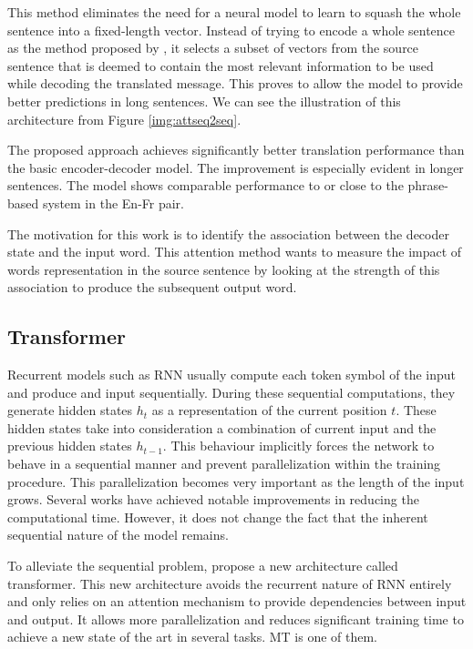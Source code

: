 This method eliminates the need for a neural model to learn to squash the whole sentence into a fixed-length vector. Instead of trying to encode a whole sentence as the method proposed by \cite{sutskever2014sequence}, it selects a subset of vectors from the source sentence that is deemed to contain the most relevant information to be used while decoding the translated message. This proves to allow the model to provide better predictions in long sentences. We can see the illustration of this architecture from Figure \ref{img:attseq2seq}.

The proposed approach achieves significantly better translation performance than the basic encoder-decoder model. The improvement is especially evident in longer sentences. The model shows comparable performance to or close to the phrase-based system in the En-Fr pair.

The motivation for this work is to identify the association between the decoder state and the input word. This attention method wants to measure the impact of words representation in the source sentence by looking at the strength of this association to produce the subsequent output word.

\subsection{Transformer}
Recurrent models such as RNN usually compute each token symbol of the input and produce and input sequentially. During these sequential computations, they generate hidden states $h_t$ as a representation of the current position $t$. These hidden states take into consideration a combination of current input and the previous hidden states $h_{t-1}$. This behaviour implicitly forces the network to behave in a sequential manner and prevent parallelization within the training procedure. This parallelization becomes very important as the length of the input grows. Several works have achieved notable improvements in reducing the computational time. However, it does not change the fact that the inherent sequential nature of the model remains.

To alleviate the sequential problem, \cite{vaswani2017attention} propose a new architecture called transformer. This new architecture avoids the recurrent nature of RNN entirely and only relies on an attention mechanism to provide dependencies between input and output. It allows more parallelization and reduces significant training time to achieve a new state of the art in several tasks. MT is one of them.

